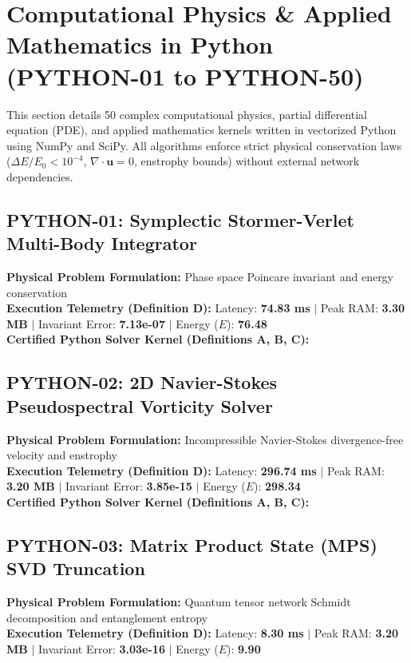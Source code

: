 \section{Computational Physics \& Applied Mathematics in Python (PYTHON-01 to PYTHON-50)}
This section details 50 complex computational physics, partial differential equation (PDE), and applied mathematics kernels written in vectorized Python using NumPy and SciPy. All algorithms enforce strict physical conservation laws ($\Delta E / E_0 < 10^{-4}$, $\nabla \cdot \mathbf{u} = 0$, enstrophy bounds) without external network dependencies.

\subsection{PYTHON-01: Symplectic Stormer-Verlet Multi-Body Integrator}
\textbf{Physical Problem Formulation:} Phase space Poincare invariant and energy conservation\\
\textbf{Execution Telemetry (Definition D):} Latency: \textbf{74.83 ms} $|$ Peak RAM: \textbf{3.30 MB} $|$ Invariant Error: \textbf{7.13e-07} $|$ Energy ($E$): \textbf{76.48}\\

\textbf{Certified Python Solver Kernel (Definitions A, B, C):}


\vspace{1em}
\subsection{PYTHON-02: 2D Navier-Stokes Pseudospectral Vorticity Solver}
\textbf{Physical Problem Formulation:} Incompressible Navier-Stokes divergence-free velocity and enstrophy\\
\textbf{Execution Telemetry (Definition D):} Latency: \textbf{296.74 ms} $|$ Peak RAM: \textbf{3.20 MB} $|$ Invariant Error: \textbf{3.85e-15} $|$ Energy ($E$): \textbf{298.34}\\

\textbf{Certified Python Solver Kernel (Definitions A, B, C):}


\vspace{1em}
\subsection{PYTHON-03: Matrix Product State (MPS) SVD Truncation}
\textbf{Physical Problem Formulation:} Quantum tensor network Schmidt decomposition and entanglement entropy\\
\textbf{Execution Telemetry (Definition D):} Latency: \textbf{8.30 ms} $|$ Peak RAM: \textbf{3.20 MB} $|$ Invariant Error: \textbf{3.03e-16} $|$ Energy ($E$): \textbf{9.90}\\

